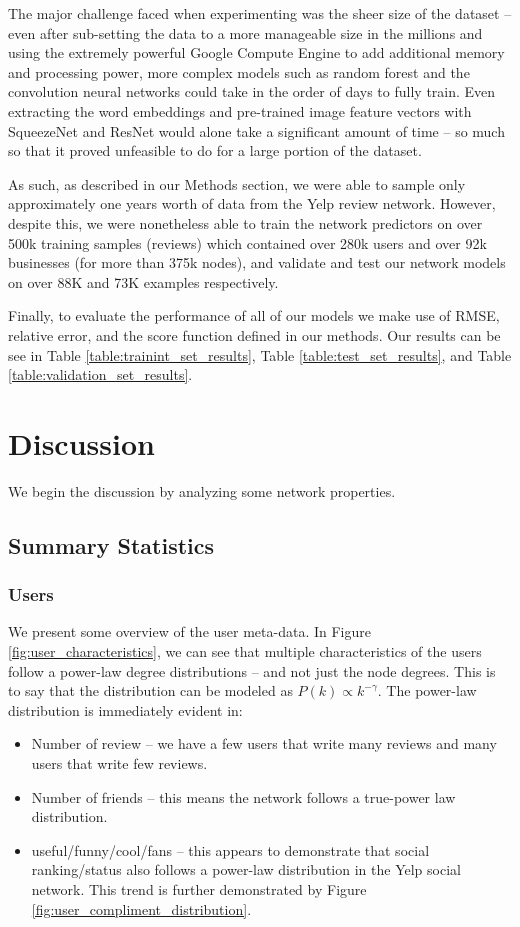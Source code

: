 \documentclass[letterpaper, 10 pt, conference]{ieeeconf}  %
\begin{document}
The major challenge faced when experimenting was the sheer size of the dataset -- even after sub-setting the data to a more manageable size in the millions and using the extremely powerful Google Compute Engine to add additional memory and processing power, more complex models such as random forest and the convolution neural networks could take in the order of days to fully train. Even extracting the word embeddings and pre-trained image feature vectors with SqueezeNet and ResNet would alone take a significant amount of time -- so much so that it proved unfeasible to do for a large portion of the dataset.

As such, as described in our Methods section, we were able to sample only approximately one years worth of data from the Yelp review network. However, despite this, we were nonetheless able to train the network predictors on over 500k training samples (reviews) which contained over 280k users and over 92k businesses (for more than 375k nodes), and validate and test our network models on over 88K and 73K examples respectively.

Finally, to evaluate the performance of all of our models we make use of RMSE, relative error, and the score function defined in our methods. Our results can be see in Table \ref{table:trainint_set_results}, Table \ref{table:test_set_results}, and Table \ref{table:validation_set_results}.

\section{Discussion}
We begin the discussion by analyzing some network properties.

\subsection{Summary Statistics}
\subsubsection{Users}
We present some overview of the user meta-data. In Figure \ref{fig:user_characteristics}, we can see that multiple characteristics of the users follow a power-law degree distributions -- and not just the node degrees. This is to say that the distribution can be modeled as $P(k) \propto k^{-\gamma}$. The power-law distribution is immediately evident in:

\begin{itemize}
\item Number of review -- we have a few users that write many reviews and many users that write few reviews.
\item Number of friends -- this means the network follows a true-power law distribution.
\item useful/funny/cool/fans -- this appears to demonstrate that social ranking/status also follows a power-law distribution in the Yelp social network. This trend is further demonstrated by Figure \ref{fig:user_compliment_distribution}.
\end{itemize} 
\end{document}
